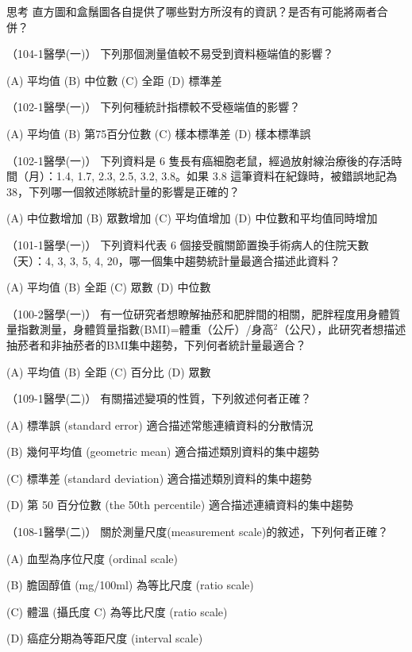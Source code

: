     \bigskip

    \begin{custom}{思考}
        直方圖和盒鬚圖各自提供了哪些對方所沒有的資訊？是否有可能將兩者合併？
    \end{custom}

    \begin{docexam}{（104-1醫學(一)）}
        下列那個測量值較不易受到資料極端值的影響？
        
        (A) 平均值  (B) 中位數  (C) 全距  (D) 標準差
    \end{docexam}

    \begin{docexam}{（102-1醫學(一)）}
        下列何種統計指標較不受極端值的影響？
        
        (A) 平均值  (B) 第75百分位數  (C) 樣本標準差  (D) 樣本標準誤
    \end{docexam}

    \begin{docexam}{（102-1醫學(一)）}
        下列資料是 6 隻長有癌細胞老鼠，經過放射線治療後的存活時間（月）：1.4, 1.7, 2.3, 2.5, 3.2, 3.8。如果 3.8 這筆資料在紀錄時，被錯誤地記為 38，下列哪一個敘述隊統計量的影響是正確的？
        
        (A) 中位數增加  (B) 眾數增加  (C) 平均值增加  (D) 中位數和平均值同時增加
    \end{docexam}

    \begin{docexam}{（101-1醫學(一)）}
        下列資料代表 6 個接受髖關節置換手術病人的住院天數（天）：4, 3, 3, 5, 4, 20，哪一個集中趨勢統計量最適合描述此資料？
        
        (A) 平均值  (B) 全距  (C) 眾數  (D) 中位數
    \end{docexam}

    \begin{docexam}{（100-2醫學(一)）}
        有一位研究者想瞭解抽菸和肥胖間的相關，肥胖程度用身體質量指數測量，身體質量指數(BMI)=體重（公斤）/身高$^2$（公尺），此研究者想描述抽菸者和非抽菸者的BMI集中趨勢，下列何者統計量最適合？
        
        (A) 平均值  (B) 全距  (C) 百分比  (D) 眾數
    \end{docexam}

    \begin{docexam}{（109-1醫學(二)）}
        有關描述變項的性質，下列敘述何者正確？
        
        (A) 標準誤 (standard error) 適合描述常態連續資料的分散情況
        
        (B) 幾何平均值 (geometric mean) 適合描述類別資料的集中趨勢
        
        (C) 標準差 (standard deviation) 適合描述類別資料的集中趨勢
        
        (D) 第 50 百分位數 (the 50th percentile) 適合描述連續資料的集中趨勢
    \end{docexam}

    \begin{docexam}{（108-1醫學(二)）}
        關於測量尺度(measurement scale)的敘述，下列何者正確？
        
        (A) 血型為序位尺度 (ordinal scale)
        
        (B) 膽固醇值 (mg/100ml) 為等比尺度 (ratio scale) 
        
        (C) 體溫 (攝氏度 C) 為等比尺度 (ratio scale)
        
        (D) 癌症分期為等距尺度 (interval scale)
    \end{docexam}